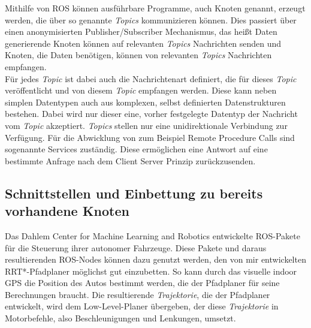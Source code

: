 Mithilfe von ROS können ausführbare Programme, auch Knoten genannt, erzeugt werden, die über so genannte \textit{Topics} kommunizieren können. Dies passiert über einen anonymisierten Publisher/Subscriber Mechanismus, das heißt Daten generierende Knoten können auf relevanten \textit{Topics} Nachrichten senden und Knoten, die Daten benötigen, können von relevanten \textit{Topics} Nachrichten empfangen. \\
Für jedes \textit{Topic} ist dabei auch die Nachrichtenart definiert, die für dieses \textit{Topic} veröffentlicht und von diesem \textit{Topic} empfangen werden. Diese kann neben simplen Datentypen auch aus komplexen, selbst definierten Datenstrukturen bestehen. Dabei wird nur dieser eine, vorher festgelegte Datentyp der Nachricht vom \textit{Topic} akzeptiert.
\textit{Topics} stellen nur eine unidirektionale Verbindung zur Verfügung. Für die Abwicklung von zum Beispiel Remote Procedure Calls sind sogenannte Services zuständig. Diese ermöglichen eine Antwort auf eine bestimmte Anfrage nach dem Client Server Prinzip zurückzusenden.
\subsection{Schnittstellen und Einbettung zu bereits vorhandene Knoten}
Das Dahlem Center for Machine Learning and Robotics entwickelte ROS-Pakete für die Steuerung ihrer autonomer Fahrzeuge. Diese Pakete und daraus resultierenden ROS-Nodes können dazu genutzt werden, den von mir entwickelten RRT*-Pfadplaner möglichst gut einzubetten. So kann durch das visuelle indoor GPS die Position des Autos bestimmt werden, die der Pfadplaner für seine Berechnungen braucht. Die resultierende \textit{Trajektorie}, die der Pfadplaner entwickelt, wird dem Low-Level-Planer übergeben, der diese \textit{Trajektorie} in Motorbefehle, also Beschleunigungen und Lenkungen, umsetzt. 
